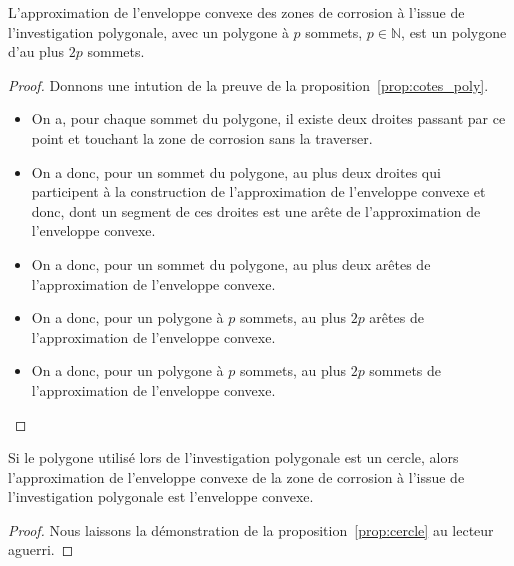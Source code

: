\documentclass[francais,RandD]{rapportPFE}
\begin{document}
				\begin{Proposition}
					L'approximation de l'enveloppe convexe des zones de corrosion à l'issue de l'investigation polygonale, avec un polygone à $p$ sommets, $p \in \mathbb{N}$, est un polygone d'au plus $2p$ sommets.
					\label{prop:cotes_poly}
				\end{Proposition}
				\begin{proof}
					Donnons une intution de la preuve de la proposition~\ref{prop:cotes_poly}.
					\begin{itemize}
						\item On a, pour chaque sommet du polygone, il existe deux droites passant par ce point et touchant la zone de corrosion sans la traverser.
						\item On a donc, pour un sommet du polygone, au plus deux droites qui participent à la construction de l'approximation de l'enveloppe convexe et donc, dont un segment de ces droites est une arête de l'approximation de l'enveloppe convexe.
						\item On a donc, pour un sommet du polygone, au plus deux arêtes de l'approximation de l'enveloppe convexe.
						\item On a donc, pour un polygone à $p$ sommets, au plus $2p$ arêtes de l'approximation de l'enveloppe convexe.
						\item On a donc, pour un polygone à $p$ sommets, au plus $2p$ sommets de l'approximation de l'enveloppe convexe.
					\end{itemize}
				\end{proof}

				\begin{Proposition}
					Si le polygone utilisé lors de l'investigation polygonale est un cercle, alors l'approximation de l'enveloppe convexe de la zone de corrosion à l'issue de l'investigation polygonale est l'enveloppe convexe.
					\label{prop:cercle}
				\end{Proposition}
				\begin{proof}
					Nous laissons la démonstration de la proposition~\ref{prop:cercle} au lecteur aguerri.
				\end{proof}
\end{document}
